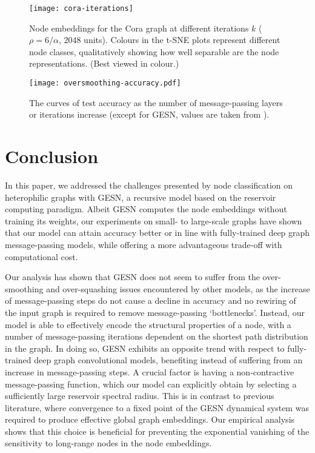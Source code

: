 \documentclass[final,5p,times,twocolumn]{elsarticle}
\begin{document}
\begin{figure*}
	\centering
	\texttt{[image: cora-iterations]}
	\caption{Node embeddings for the Cora graph at different iterations $k$ ($\rho = 6 / \alpha$, $2048$ units). Colours in the t-SNE plots represent different node classes, qualitatively showing how well separable are the node representations. (Best viewed in colour.)}
	\label{fig:cora-iterations}
\end{figure*}


\begin{figure*}
	\centering
	\texttt{[image: oversmoothing-accuracy.pdf]}
	\caption{The curves of test accuracy as the number of message-passing layers or iterations increase (except for GESN, values are taken from \cite{Yan2022}).}
	\label{fig:oversmoothing-accuracy}
\end{figure*}


\section{Conclusion}
\label{sec:conclusion}

In this paper, we addressed the challenges presented by node classification on heterophilic graphs with GESN, a recursive model based on the reservoir computing paradigm.
Albeit GESN computes the node embeddings without training its weights, our experiments on small- to large-scale graphs have shown that our model can attain accuracy better or in line with fully-trained deep graph message-passing models, while offering a more advantageous trade-off with computational cost.

Our analysis has shown that GESN does not seem to suffer from the over-smoothing and over-squashing issues encountered by other models, as the increase of message-passing steps do not cause a decline in accuracy and no rewiring of the input graph is required to remove message-passing `bottlenecks'.
Instead, our model is able to effectively encode the structural properties of a node, with a number of message-passing iterations dependent on the shortest path distribution in the graph.
In doing so, GESN exhibits an opposite trend with respect to fully-trained deep graph convolutional models, benefiting instead of suffering from an increase in message-passing steps.
A crucial factor is having a non-contractive message-passing function, which our model can explicitly obtain by selecting a sufficiently large reservoir spectral radius.
This is in contrast to previous literature, where convergence to a fixed point of the GESN dynamical system was required to produce effective global graph embeddings.
Our empirical analysis shows that this choice is beneficial for preventing the exponential vanishing of the sensitivity to long-range nodes in the node embeddings.
\end{document}
